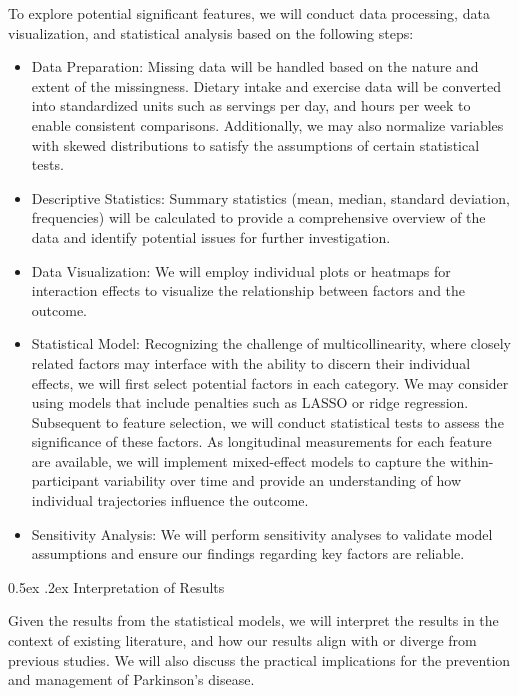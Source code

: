 \documentclass[12pt,]{article}
\makeatletter
\renewcommand\subsubsection{
  \@startsection{subsubsection}{3}{\z@}
    {-1.0ex\@plus -1ex \@minus -.2ex}%
    {0.5ex \@plus .2ex}%
    {\normalfont\normalsize\bf}} %
\makeatother
\begin{document}
To explore potential significant features, we will conduct data
processing, data visualization, and statistical analysis based on the
following steps:

\begin{itemize}
\item
  Data Preparation: Missing data will be handled based on the nature and
  extent of the missingness. Dietary intake and exercise data will be
  converted into standardized units such as servings per day, and hours
  per week to enable consistent comparisons. Additionally, we may also
  normalize variables with skewed distributions to satisfy the
  assumptions of certain statistical tests.
\item
  Descriptive Statistics: Summary statistics (mean, median, standard
  deviation, frequencies) will be calculated to provide a comprehensive
  overview of the data and identify potential issues for further
  investigation.
\item
  Data Visualization: We will employ individual plots or heatmaps for
  interaction effects to visualize the relationship between factors and
  the outcome.
\item
  Statistical Model: Recognizing the challenge of multicollinearity,
  where closely related factors may interface with the ability to
  discern their individual effects, we will first select potential
  factors in each category. We may consider using models that include
  penalties such as LASSO or ridge regression. Subsequent to feature
  selection, we will conduct statistical tests to assess the
  significance of these factors. As longitudinal measurements for each
  feature are available, we will implement mixed-effect models to
  capture the within-participant variability over time and provide an
  understanding of how individual trajectories influence the outcome.
\item
  Sensitivity Analysis: We will perform sensitivity analyses to validate
  model assumptions and ensure our findings regarding key factors are
  reliable.
\end{itemize}

\hypertarget{interpretation-of-results}{%
\subsubsection{Interpretation of
Results}\label{interpretation-of-results}}

Given the results from the statistical models, we will interpret the
results in the context of existing literature, and how our results align
with or diverge from previous studies. We will also discuss the
practical implications for the prevention and management of Parkinson's
disease.
\end{document}
